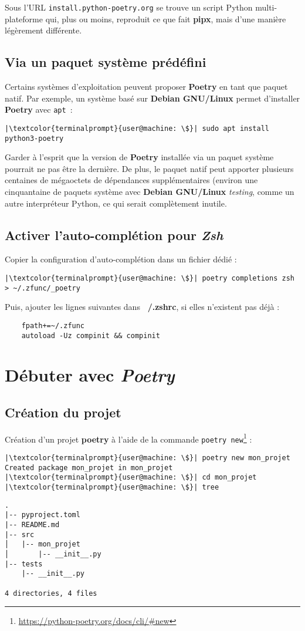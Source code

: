 Sous l’URL \texttt{install.python-poetry.org} se trouve un script Python multi-plateforme qui, plus ou moins, reproduit ce que fait \textbf{pipx}, mais d’une manière légèrement différente.

\subsection*{Via un paquet système prédéfini}
Certains systèmes d’exploitation peuvent proposer \textbf{Poetry} en tant que paquet natif. Par exemple, un système basé sur \textbf{Debian GNU/Linux} permet d’installer \textbf{Poetry} avec \texttt{apt} :
\begin{lstlisting}[style=terminal]
|\textcolor{terminalprompt}{user@machine: \$}| sudo apt install python3-poetry
\end{lstlisting}

Garder à l’esprit que la version de \textbf{Poetry} installée via un paquet système pourrait ne pas être la dernière. De plus, le paquet natif peut apporter plusieurs centaines de mégaoctets de dépendances supplémentaires (environ une cinquantaine de paquets système avec \textbf{Debian  GNU/Linux} \textit{testing}, comme un autre interpréteur Python, ce qui serait complètement inutile.

\subsection*{Activer l'auto-complétion  pour \textit{Zsh}}
Copier la configuration d'auto-complétion dans un fichier dédié :
\begin{lstlisting}[style=terminal]
|\textcolor{terminalprompt}{user@machine: \$}| poetry completions zsh > ~/.zfunc/_poetry
\end{lstlisting}

Puis, ajouter les lignes suivantes dans  \textbf{~/.zshrc}, si elles n'existent pas déjà :
\begin{verbatim}
    fpath+=~/.zfunc
    autoload -Uz compinit && compinit
\end{verbatim}

\section{Débuter avec \textit{Poetry}}
\subsection*{Création du projet}
Création d'un projet \textbf{poetry} à l'aide de la commande \texttt{poetry new}\footnote{\url{https://python-poetry.org/docs/cli/\#new}} :
\begin{lstlisting}[style=terminal]
|\textcolor{terminalprompt}{user@machine: \$}| poetry new mon_projet
Created package mon_projet in mon_projet
|\textcolor{terminalprompt}{user@machine: \$}| cd mon_projet
|\textcolor{terminalprompt}{user@machine: \$}| tree
\end{lstlisting}
\begin{verbatim}
.
|-- pyproject.toml
|-- README.md
|-- src
│   |-- mon_projet
│       |-- __init__.py
|-- tests
    |-- __init__.py

4 directories, 4 files
\end{verbatim}

